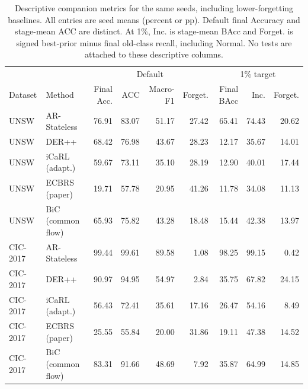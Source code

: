 \begin{table}[t]\centering\scriptsize
\caption{Descriptive companion metrics for the same seeds, including lower-forgetting baselines. All entries are seed means (percent or pp). Default final Accuracy and stage-mean ACC are distinct. At 1\%, Inc. is stage-mean BAcc and Forget. is signed best-prior minus final old-class recall, including Normal. No tests are attached to these descriptive columns.}
\label{tab:section178-s1-descriptive}
\begin{tabular}{llrrrrrrr}\toprule
& & \multicolumn{4}{c}{Default} & \multicolumn{3}{c}{1\% target}\\
Dataset & Method & Final Acc. & ACC & Macro-F1 & Forget. & Final BAcc & Inc. & Forget.\\\midrule
UNSW & AR-Stateless & 76.91 & 83.07 & 51.17 & 27.42 & 65.41 & 74.43 & 20.62\\
UNSW & DER++ & 68.42 & 76.98 & 43.67 & 28.23 & 12.17 & 35.67 & 14.01\\
UNSW & iCaRL (adapt.) & 59.67 & 73.11 & 35.10 & 28.19 & 12.90 & 40.01 & 17.44\\
UNSW & ECBRS (paper) & 19.71 & 57.78 & 20.95 & 41.26 & 11.78 & 34.08 & 11.13\\
UNSW & BiC (common flow) & 65.93 & 75.82 & 43.28 & 18.48 & 15.44 & 42.38 & 13.97\\
CIC-2017 & AR-Stateless & 99.44 & 99.61 & 89.58 & 1.08 & 98.25 & 99.15 & 0.42\\
CIC-2017 & DER++ & 90.97 & 94.95 & 54.97 & 2.84 & 35.75 & 67.82 & 24.15\\
CIC-2017 & iCaRL (adapt.) & 56.43 & 72.41 & 35.61 & 17.16 & 26.47 & 54.16 & 8.49\\
CIC-2017 & ECBRS (paper) & 25.55 & 55.84 & 20.00 & 31.86 & 19.11 & 47.38 & 14.52\\
CIC-2017 & BiC (common flow) & 83.31 & 91.66 & 48.69 & 7.92 & 35.87 & 64.99 & 14.85\\
\bottomrule\end{tabular}\end{table}
